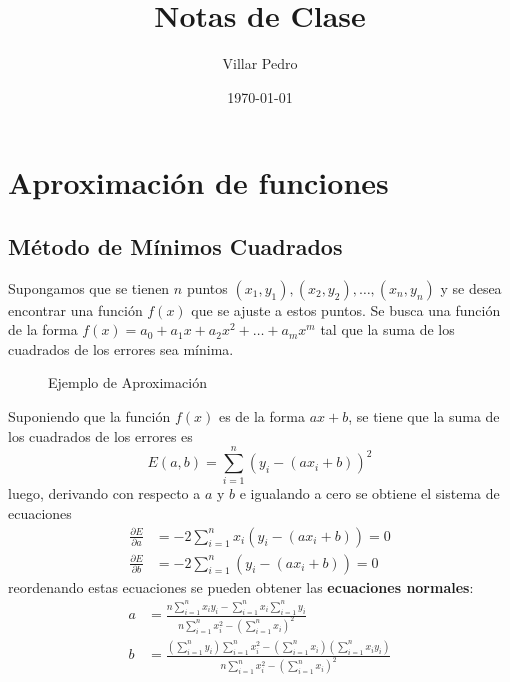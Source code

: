 \documentclass{article}
\title{Notas de Clase}
\author{Villar Pedro}
\date{\today}
\begin{document}
\maketitle
\newpage
\tableofcontents
\newpage
\listoffigures
\newpage
\section[Unidad 4 - Aproximación de Funciones]{Aproximación de funciones}
\subsection[Aproximación con n puntos]{Método de Mínimos Cuadrados}
Supongamos que se tienen $n$ puntos $(x_1, y_1), (x_2, y_2), \dots, (x_n, y_n)$ y se desea encontrar una función $f(x)$ que se ajuste a estos puntos. Se busca una función de la forma $f(x) = a_0 + a_1x + a_2x^2 + \dots + a_mx^m$ tal que la suma de los cuadrados de los errores sea mínima. 
\begin{figure}[h]
    \centering
    \caption{Ejemplo de Aproximación}
    \label{fig:myplot}
\end{figure}
Suponiendo que la función $f(x)$ es de la forma $ax+b$, se tiene que la suma de los cuadrados de los errores es
\begin{equation}
    E(a,b) = \sum_{i=1}^{n} (y_i - (ax_i + b))^2
\end{equation}
luego, derivando con respecto a $a$ y $b$ e igualando a cero se obtiene el sistema de ecuaciones
\begin{align}
    \frac{\partial E}{\partial a} &= -2\sum_{i=1}^{n} x_i(y_i - (ax_i + b)) = 0 \\
    \frac{\partial E}{\partial b} &= -2\sum_{i=1}^{n} (y_i - (ax_i + b)) = 0
\end{align}
reordenando estas ecuaciones se pueden obtener las \textbf{ecuaciones normales}:
\begin{align}
    a &= \frac{n\sum_{i=1}^{n} x_iy_i - \sum_{i=1}^{n} x_i \sum_{i=1}^{n} y_i}{n\sum_{i=1}^{n} x_i^2 - (\sum_{i=1}^{n} x_i)^2} \\
    b &= \frac{(\sum_{i=1}^{n} y_i)\sum_{i=1}^{n} x_i^2 - (\sum_{i=1}^{n} x_i)(\sum_{i=1}^{n} x_iy_i)}{n\sum_{i=1}^{n} x_i^2 - (\sum_{i=1}^{n} x_i)^2}
\end{align}
\newpage
\end{document}

